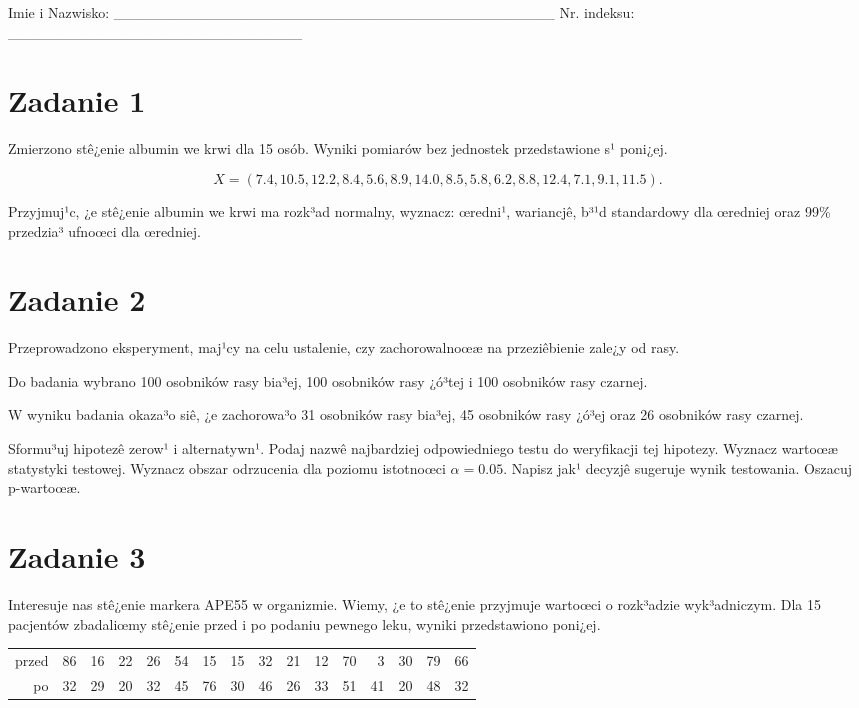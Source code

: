 \documentclass[a4paper,12pt]{article}
\begin{document}
 Imie i Nazwisko: \_\_\_\_\_\_\_\_\_\_\_\_\_\_\_\_\_\_\_\_\_\_\_\_\_\_\_\_\_\_\_\_\_\_\_\_\_\_\_\_\_\_ Nr. indeksu: \_\_\_\_\_\_\_\_\_\_\_\_\_\_\_\_\_\_\_\_\_\_\_\_\_\_\_\_ 
 \section*{Zadanie 1}
     
     Zmierzono stê¿enie albumin we krwi dla 15 osób. 
     Wyniki pomiarów bez jednostek przedstawione s¹ poni¿ej. 
     
     \noindent $$X=(  7.4, 10.5, 12.2,  8.4,  5.6,  8.9, 14.0,  8.5,  5.8,  6.2,  8.8, 12.4,  7.1,  9.1, 11.5 ).$$
     
     Przyjmuj¹c, ¿e stê¿enie albumin we krwi ma rozk³ad normalny, 
     wyznacz: œredni¹, wariancjê, b³¹d standardowy dla œredniej oraz 99\% przedzia³ ufnoœci dla œredniej. \vspace{1cm} 

  \section*{Zadanie 2}
     
  Przeprowadzono eksperyment, maj¹cy na celu ustalenie, czy zachorowalnoœæ na przeziêbienie zale¿y od rasy.
  
  Do badania wybrano 100 osobników rasy bia³ej, 100 osobników rasy ¿ó³tej i 100 osobników rasy czarnej. 
  
  W wyniku badania okaza³o siê, ¿e zachorowa³o 31 osobników rasy bia³ej, 45 osobników rasy ¿ó³ej oraz 26 osobników rasy czarnej. 
  
  Sformu³uj hipotezê zerow¹ i alternatywn¹. 
  Podaj nazwê najbardziej odpowiedniego testu do weryfikacji tej hipotezy. 
  Wyznacz wartoœæ statystyki testowej. 
  Wyznacz obszar odrzucenia dla poziomu istotnoœci $\alpha=0.05$. 
  Napisz jak¹ decyzjê sugeruje wynik testowania. Oszacuj p-wartoœæ. \vspace{1cm} 

  \section*{Zadanie 3}
     
  Interesuje nas stê¿enie markera APE55  w organizmie. 
  Wiemy, ¿e to stê¿enie przyjmuje wartoœci o rozk³adzie wyk³adniczym. 
  Dla 15 pacjentów zbadaliœmy stê¿enie przed i po podaniu pewnego leku, 
  wyniki przedstawiono poni¿ej.
  
  \vspace{0.5cm} 
  \noindent\begin{center} 
\begin{tabular}{rrrrrrrrrrrrrrrr}
  \hline
  \hline
przed & 86 & 16 & 22 & 26 & 54 & 15 & 15 & 32 & 21 & 12 & 70 & 3 & 30 & 79 & 66 \\
  po & 32 & 29 & 20 & 32 & 45 & 76 & 30 & 46 & 26 & 33 & 51 & 41 & 20 & 48 & 32 \\
   \hline
\end{tabular}
 
  \end{center} 
  \vspace{0.5cm}
  
\end{document}
